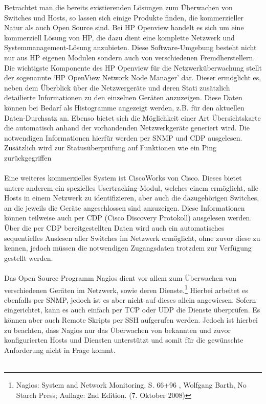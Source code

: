 Betrachtet man die bereits existierenden Lösungen zum Überwachen von Switches und Hosts, so lassen sich einige Produkte finden, die kommerzieller Natur als auch Open Source sind.
Bei HP Openview handelt es sich um eine kommerziell Lösung von HP, die dazu dient eine komplette Netzwerk und Systemmanagement-Lösung anzubieten. Diese Software-Umgebung besteht nicht nur aus HP eigenen Modulen sondern auch von verschiedenen Fremdherstellern.
Die wichtigste Komponente des HP Openview für die Netzwerküberwachung stellt der sogenannte ‘HP OpenView Network Node Manager’ dar.
Dieser ermöglicht es, neben dem Überblick über die Netzwergeräte und deren Stati zusätzlich detailierte Informationen zu den einzelnen Geräten anzuzeigen.
Diese Daten können bei Bedarf als Histogramme angezeigt werden, z.B. für den aktuellen Daten-Durchsatz an.
Ebenso bietet sich die Möglichkeit einer Art Übersichtskarte die automatisch anhand der vorhandenden Netzwerkgeräte generiert wird. Die notwendigen Informationen hierfür werden per SNMP und CDP ausgelesen. Zusätzlich wird zur Statusüberprüfung auf Funktionen wie ein Ping zurückgegriffen\\\\
Eine weiteres kommerzielles System ist CiscoWorks von Cisco. Dieses bietet untere anderem ein spezielles Usertracking-Modul, welches einem ermöglicht, alle Hosts in einem Netzwerk zu identifizieren, aber auch die dazugehörigen Switches, an die jeweils die Geräte angeschlossen sind anzuzeigen. Diese Informationen können teilweise auch per CDP (Cisco Discovery Protokoll) ausgelesen werden.
Über die per CDP bereitgestellten Daten wird auch ein automatisches sequentielles Auslesen aller Switches im Netzwerk ermöglicht, ohne zuvor diese zu kennen, jedoch müssen die notwendigen Zugangsdaten trotzdem zur Verfügung gestellt werden.\\\\
Das Open Source Programm Nagios dient vor allem zum Überwachen von verschiedenen Geräten im Netzwerk, sowie deren Dienste.\footnote{Nagios: System and Network Monitoring, S. 66+96 , Wolfgang Barth, No Starch Press; Auflage: 2nd Edition. (7. Oktober 2008)}
Hierbei arbeitet es ebenfalls per SNMP, jedoch ist es aber nicht auf dieses allein angewiesen.
Sofern eingerichtet, kann es auch einfach per TCP oder UDP die Dienste überprüfen.
Es können aber auch Remote Skripts per SSH aufgerufen werden.
Jedoch ist hierbei zu beachten, dass Nagios nur das Überwachen von bekannten und zuvor konfigurierten Hosts und Diensten unterstützt und somit für die gewünschte Anforderung nicht in Frage kommt.\\\\
